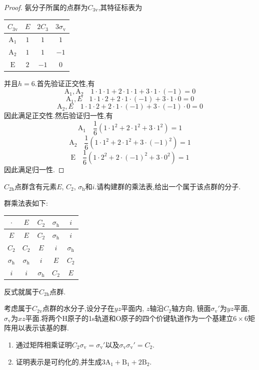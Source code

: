 \documentclass{ctexart}
\begin{document}
\begin{proof}
    氨分子所属的点群为$C_{3\text{v}}$,其特征标表为
    \begin{table}[H]\centering
        \begin{tabular}{|c|c|c|c|}\hline
            $C_{3\text{v}}$ & $E$ & $2C_3$ & $3\sigma_\text{v}$ \\\hline
            $\text{A}_1$ & $1$ & $1$ & $1$ \\\hline
            $\text{A}_2$ & $1$ & $1$ & $-1$ \\\hline
            $\text{E}$ & $2$ & $-1$ & $0$ \\\hline
        \end{tabular}        
    \end{table}
    并且$h=6$.首先验证正交性,有
    \[\text{A}_1,\text{A}_2\quad 1\cdot1\cdot1+2\cdot1\cdot1+3\cdot1\cdot(-1)=0\]
    \[\text{A}_1,E\quad 1\cdot1\cdot2+2\cdot1\cdot(-1)+3\cdot1\cdot0=0\]
    \[\text{A}_2,E\quad 1\cdot1\cdot2+2\cdot1\cdot(-1)+3\cdot(-1)\cdot0=0\]
    因此满足正交性.然后验证归一性,有
    \[\text{A}_1\quad\dfrac{1}{6}(1\cdot1^2+2\cdot1^2+3\cdot1^2)=1\]
    \[\text{A}_2\quad\dfrac{1}{6}(1\cdot1^2+2\cdot1^2+3\cdot(-1)^2)=1\]
    \[\text{E}\quad\dfrac{1}{6}(1\cdot2^2+2\cdot(-1)^2+3\cdot0^2)=1\]
    因此满足归一性.
\end{proof}
\begin{homework}[8.]
    $C_{2\text{h}}$点群含有元素$E$, $C_2$, $\sigma_\text{h}$和$i$.请构建群的乘法表,给出一个属于该点群的分子.
\end{homework}
\begin{solution}
    群乘法表如下:
    \begin{table}[H]\centering
        \begin{tabular}{|c|c|c|c|c|}\hline
            $\cdot$ & $E$ & $C_2$ & $\sigma_\text{h}$ & $i$ \\\hline
            $E$ & $E$ & $C_2$ & $\sigma_\text{h}$ & $i$ \\\hline
            $C_2$ & $C_2$ & $E$ & $i$ & $\sigma_\text{h}$ \\\hline
            $\sigma_\text{h}$ & $\sigma_\text{h}$ & $i$ & $E$ & $C_2$ \\\hline
            $i$ & $i$ & $\sigma_\text{h}$ & $C_2$ & $E$ \\\hline
        \end{tabular}
    \end{table}
    反式就属于$C_{2\text{h}}$点群.
\end{solution}
\begin{homework}[9.]
    考虑属于$C_{2\text{v}}$点群的水分子,设分子在$yz$平面内, $z$轴沿$C_2$轴方向, 镜面$\sigma_{\text{v}}'$为$yz$平面, $\sigma_{\text{v}}$为$xz$平面.将两个H原子的1s轨道和O原子的四个价键轨道作为一个基建立$6\times6$矩阵用以表示该基的群.
    \begin{enumerate}[label=\tbf{(\alph*)}]
        \item 通过矩阵相乘证明$C_2\sigma_{\text{v}}=\sigma_{\text{v}}'$以及$\sigma_{\text{v}}\sigma_{\text{v}}'=C_2$.
        \item 证明表示是可约化的,并生成$3\text{A}_1+\text{B}_1+2\text{B}_2$.
    \end{enumerate}
\end{homework}
\end{document}
